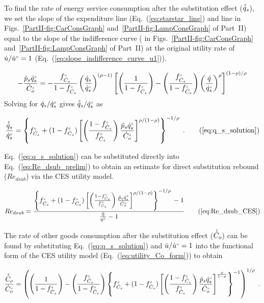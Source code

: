 To find the rate of energy service consumption after the substitution effect
($\hat{\dot{q}}_s$), we set the slope of the 
expenditure line (Eq.~(\ref{eq:starstar_line})
and line \starstar{} in 
Figs.~\ref{PartII-fig:CarConsGraph} 
and~\ref{PartII-fig:LampConsGraph} of Part~II)
equal to the slope of the 
indifference curve 
(\iicirc{} in 
Figs.~\ref{PartII-fig:CarConsGraph} 
and~\ref{PartII-fig:LampConsGraph} of Part~II)
at the original utility rate of $\dot{u}/{}{\dot{u}}^{\scriptscriptstyle \circ} = 1$ (Eq.~(\ref{eq:slope_indifference_curve_u1})).

\begin{equation}
  -\frac{\amacro{p}_s \rbempl{q}_s}
        {\rbempl{C}_o} = 
    -\frac{\fCs}{1 - \fCs} \left( \frac{\rate{q}_s}{\rbempl{q}_s} \right)^{(\rho -1)} %
        \left[ \left( \frac{1}{1 - \fCs} \right) 
                - \left( \frac{\fCs}{1 - \fCs} \right) 
                          \left( \frac{\rate{q}}{\rbempl{q}_s} \right)^\rho \right]^{(1 - \rho)/\rho}
\end{equation}
%
Solving for $\dot{q}_s/{}{\dot{q}}^{\scriptscriptstyle \circ}_s$ gives $\hat{\dot{q}}_s/{}{\dot{q}}^{\scriptscriptstyle \circ}_s$ as

\begin{equation}
  \frac{\rasub{q}_s}{\rbempl{q}_s} = \qssolution{} \; . \tag{\ref{eq:q_s_solution}}
\end{equation}

Eq.~(\ref{eq:q_s_solution}) can be substituted directly
into Eq.~(\ref{eq:Re_dsub_prelim})
to obtain an estimate for direct substitution rebound ($Re_{dsub}$)
via the CES utility model.

\begin{equation}
  Re_{dsub} = \RedsubCES{} \tag{\ref{eq:Re_dsub_CES}}
\end{equation}

The rate of other goods consumption after the substitution effect ($\hat{\dot{C}}_o$) 
can be found by substituting Eq.~(\ref{eq:q_s_solution}) and 
$\dot{u}/{}{\dot{u}}^{\scriptscriptstyle \circ} = 1$ 
into the functional form of the CES utility model (Eq.~(\ref{eq:utility_Co_form}))
to obtain

\begin{equation}
  \frac{\hat{\dot{C}}_o}{{}{\dot{C}}^{\scriptscriptstyle \circ}_o} = \left( \left( \frac{1}{1-{}{f}^{\scriptscriptstyle \circ}_{\dot{C}_s}} \right) 
                                     - \left( \frac{{}{f}^{\scriptscriptstyle \circ}_{\dot{C}_s}}{1-{}{f}^{\scriptscriptstyle \circ}_{\dot{C}_s}} \right)   
              \left\{ {}{f}^{\scriptscriptstyle \circ}_{\dot{C}_s} + (1-{}{f}^{\scriptscriptstyle \circ}_{\dot{C}_s})
                  \left[ \left( \frac{1-{}{f}^{\scriptscriptstyle \circ}_{\dot{C}_s}}{{}{f}^{\scriptscriptstyle \circ}_{\dot{C}_s}} \right) \frac{\tilde{p}_s {}{\dot{q}}^{\scriptscriptstyle \circ}_s}{{}{\dot{C}}^{\scriptscriptstyle \circ}_o}   \right] 
                      ^{\frac{\rho}{1-\rho}} \right\} ^{-1} \right) ^{1/\rho} \; .
\end{equation}

